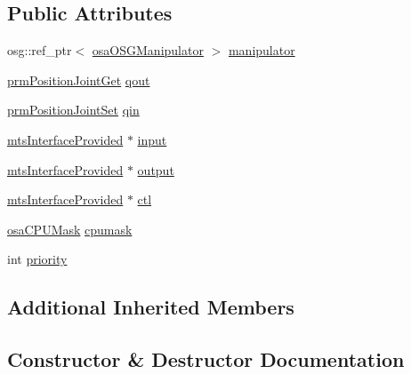 \subsection*{Public Attributes}
\begin{DoxyCompactItemize}
\item 
osg\+::ref\+\_\+ptr$<$ \hyperlink{classosa_o_s_g_manipulator}{osa\+O\+S\+G\+Manipulator} $>$ \hyperlink{classmts_o_d_e_manipulator_task_af71c105f986e50bd23dd3a385bbf73d4}{manipulator}
\item 
\hyperlink{classprm_position_joint_get}{prm\+Position\+Joint\+Get} \hyperlink{classmts_o_d_e_manipulator_task_a162ca16e37ce8838ff2214b8b33f4b84}{qout}
\item 
\hyperlink{classprm_position_joint_set}{prm\+Position\+Joint\+Set} \hyperlink{classmts_o_d_e_manipulator_task_a07c031b24bcc9abafd6b00f1f8353a39}{qin}
\item 
\hyperlink{classmts_interface_provided}{mts\+Interface\+Provided} $\ast$ \hyperlink{classmts_o_d_e_manipulator_task_ad765a99ba781dadce40237760b2ea115}{input}
\item 
\hyperlink{classmts_interface_provided}{mts\+Interface\+Provided} $\ast$ \hyperlink{classmts_o_d_e_manipulator_task_a73b391727790f249e975cb84a385f753}{output}
\item 
\hyperlink{classmts_interface_provided}{mts\+Interface\+Provided} $\ast$ \hyperlink{classmts_o_d_e_manipulator_task_adc6a0ee6337d56ed19e8dddf86586498}{ctl}
\item 
\hyperlink{osa_c_p_u_affinity_8h_aaec7cdd7797e5e6eb5438c15fee5477a}{osa\+C\+P\+U\+Mask} \hyperlink{classmts_o_d_e_manipulator_task_aaff55dbeff38e947707c6b3405041622}{cpumask}
\item 
int \hyperlink{classmts_o_d_e_manipulator_task_ae2b16e466e4d216b2cf13ae89414696a}{priority}
\end{DoxyCompactItemize}
\subsection*{Additional Inherited Members}


\subsection{Constructor \& Destructor Documentation}
\hypertarget{classmts_o_d_e_manipulator_task_a96f32aa849ef22dda77166d79d7b0839}{}
